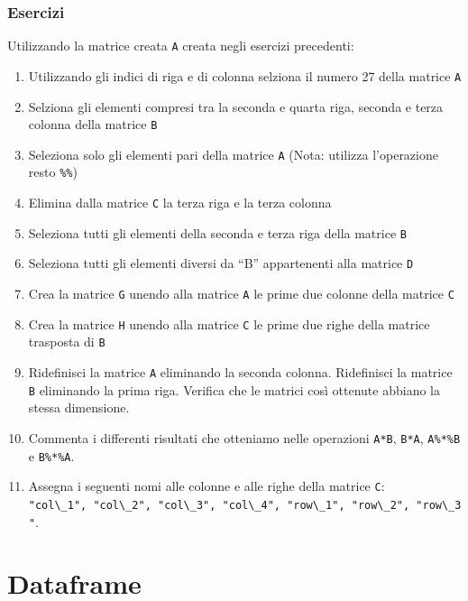 \documentclass[
]{book}
\providecommand{\tightlist}{%
  \setlength{\itemsep}{0pt}\setlength{\parskip}{0pt}}
\begin{document}
\hypertarget{esercizi-7}{%
\subsection*{Esercizi}\label{esercizi-7}}

Utilizzando la matrice creata \texttt{A} creata negli esercizi precedenti:

\begin{enumerate}
\def\labelenumi{\arabic{enumi}.}
\tightlist
\item
  Utilizzando gli indici di riga e di colonna selziona il numero 27 della matrice \texttt{A}
\item
  Selziona gli elementi compresi tra la seconda e quarta riga, seconda e terza colonna della matrice \texttt{B}
\item
  Seleziona solo gli elementi pari della matrice \texttt{A} (Nota: utilizza l'operazione resto \texttt{\%\%})
\item
  Elimina dalla matrice \texttt{C} la terza riga e la terza colonna
\item
  Seleziona tutti gli elementi della seconda e terza riga della matrice \texttt{B}
\item
  Seleziona tutti gli elementi diversi da ``B'' appartenenti alla matrice \texttt{D}
\item
  Crea la matrice \texttt{G} unendo alla matrice \texttt{A} le prime due colonne della matrice \texttt{C}
\item
  Crea la matrice \texttt{H} unendo alla matrice \texttt{C} le prime due righe della matrice trasposta di \texttt{B}
\item
  Ridefinisci la matrice \texttt{A} eliminando la seconda colonna. Ridefinisci la matrice \texttt{B} eliminando la prima riga. Verifica che le matrici così ottenute abbiano la stessa dimensione.
\item
  Commenta i differenti risultati che otteniamo nelle operazioni \texttt{A*B}, \texttt{B*A}, \texttt{A\%*\%B} e \texttt{B\%*\%A}.
\item
  Assegna i seguenti nomi alle colonne e alle righe della matrice \texttt{C}: \texttt{"col\textbackslash{}\_1",\ "col\textbackslash{}\_2",\ "col\textbackslash{}\_3",\ "col\textbackslash{}\_4",\ "row\textbackslash{}\_1",\ "row\textbackslash{}\_2",\ "row\textbackslash{}\_3"}.
\end{enumerate}

\hypertarget{dataframe}{%
\chapter{Dataframe}\label{dataframe}}
\end{document}
